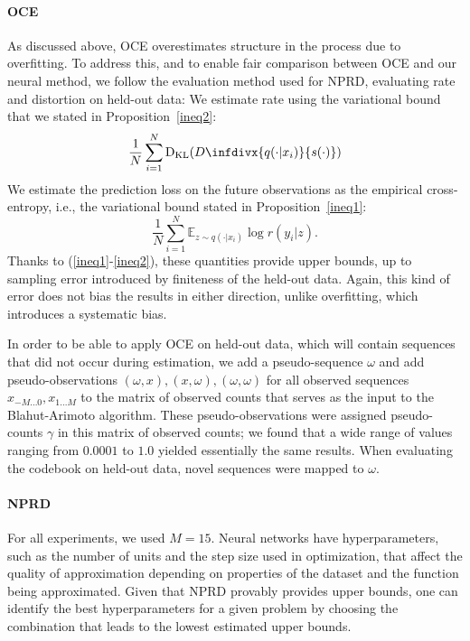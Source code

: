 \documentclass[11pt,letterpaper]{article}
\newcommand{\E}[0]{\mathbb{E}}
\newcommand{\infdiv}{D\infdivx}
\begin{document}
\paragraph{OCE}
As discussed above, OCE overestimates structure in the process due to overfitting.
To address this, and to enable fair comparison between OCE and our neural method, we follow the evaluation method used for NPRD, evaluating rate and distortion on held-out data:
We estimate rate using the variational bound that we stated in Proposition~\ref{ineq2}:
\begin{equation}
\frac{1}{N} \sum_{i=1}^N \operatorname{D_{KL}}(\infdiv{q(\cdot|x_i)}{s(\cdot)})
\end{equation}
We estimate the prediction loss on the future observations as the empirical cross-entropy, i.e., the variational bound stated in Proposition~\ref{ineq1}:
\begin{equation}
\frac{1}{N} \sum_{i=1}^N \E_{z \sim q(\cdot|x_i)} \log r(y_i|z).
\end{equation}
Thanks to (\ref{ineq1}-\ref{ineq2}), these quantities provide upper bounds, up to sampling error introduced by finiteness of the held-out data.
Again, this kind of error does not bias the results in either direction, unlike overfitting, which introduces a systematic bias.


In order to be able to apply OCE on held-out data, which will contain sequences that did not occur during estimation, we add a pseudo-sequence $\omega$ and add pseudo-observations $(\omega, x), (x, \omega), (\omega, \omega)$ for all observed sequences $x_{-M...0}, x_{1...M}$ to the matrix of observed counts that serves as the input to the Blahut-Arimoto algorithm.
These pseudo-observations were assigned pseudo-counts $\gamma$ in this matrix of observed counts; we found that a wide range of values ranging from $0.0001$ to $1.0$ yielded essentially the same results.
When evaluating the codebook on held-out data, novel sequences were mapped to $\omega$.


\paragraph{NPRD}
For all experiments, we used $M=15$.
Neural networks have hyperparameters, such as the number of units and the step size used in optimization, that affect the quality of approximation depending on properties of the dataset and the function being approximated.
Given that NPRD provably provides upper bounds, one can identify the best hyperparameters for a given problem by choosing the combination that leads to the lowest estimated upper bounds.
\end{document}
